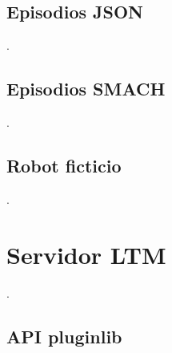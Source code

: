 \subsection{Episodios JSON}
.

\subsection{Episodios SMACH}
.

\subsection{Robot ficticio}




.

\section{Servidor LTM}

.

\subsection{API pluginlib}

